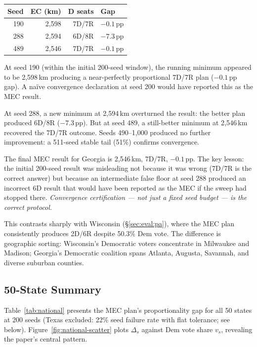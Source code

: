 \begin{center}
\begin{tabular}{rrrl}
\toprule
Seed & EC (km) & D seats & Gap \\
\midrule
190 & 2{,}598 & 7D/7R & $-0.1$\,pp \\
288 & 2{,}594 & 6D/8R & $-7.3$\,pp \\
489 & 2{,}546 & 7D/7R & $-0.1$\,pp \\
\bottomrule
\end{tabular}
\end{center}

At seed 190 (within the initial 200-seed window), the running minimum appeared to
be 2{,}598\,km producing a near-perfectly proportional 7D/7R plan ($-0.1$\,pp
gap). A na{\"i}ve convergence declaration at seed 200 would have reported this
as the MEC result.

At seed 288, a new minimum at 2{,}594\,km overturned the result: the better
plan produced 6D/8R ($-7.3$\,pp). But at seed 489, a still-better minimum at
2{,}546\,km recovered the 7D/7R outcome. Seeds 490--1{,}000 produced no
further improvement: a 511-seed stable tail (51\%) confirms convergence.

The final MEC result for Georgia is 2{,}546\,km, 7D/7R, $-0.1$\,pp. The key
lesson: the initial 200-seed result was misleading not because it was wrong
(7D/7R is the correct answer) but because an intermediate false floor at
seed 288 produced an incorrect 6D result that would have been reported as the
MEC if the sweep had stopped there. \emph{Convergence certification --- not
just a fixed seed budget --- is the correct protocol.}

This contrasts sharply with Wisconsin (\S\ref{sec:eval:pa}), where the MEC
plan consistently produces 2D/6R despite 50.3\% Dem vote. The difference is
geographic sorting: Wisconsin's Democratic voters concentrate in Milwaukee and
Madison; Georgia's Democratic coalition spans Atlanta, Augusta, Savannah, and
diverse suburban counties.

\subsection{50-State Summary}
\label{sec:eval:national}

Table~\ref{tab:national} presents the MEC plan's proportionality gap for
all 50 states at 200 seeds (Texas excluded: 22\% seed failure rate with flat
tolerance; see below). Figure~\ref{fig:national-scatter} plots $\Delta_s$
against Dem vote share $v_s$, revealing the paper's central pattern.

